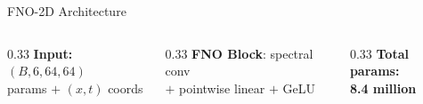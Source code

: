 \documentclass[aspectratio=169,12pt]{beamer}
\begin{document}
\begin{frame}{FNO-2D Architecture}
  \vspace{4pt}
  \begin{columns}
    \begin{column}{0.33\textwidth}
      \centering\small
      \textbf{Input:} $(B, 6, 64, 64)$\\
      params $+$ $(x,t)$ coords
    \end{column}
    \begin{column}{0.33\textwidth}
      \centering\small
      \textbf{FNO Block}: spectral conv\\
      $+$ pointwise linear $+$ GeLU
    \end{column}
    \begin{column}{0.33\textwidth}
      \centering\small
      \textbf{Total params:}\\
      \alert{\textbf{8.4 million}}
    \end{column}
  \end{columns}
\end{frame}
\end{document}
